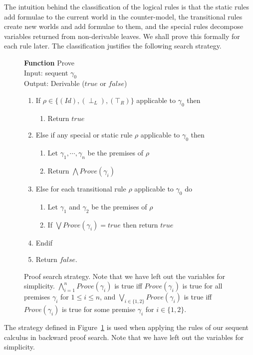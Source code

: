 \documentclass{llncs}
\numberwithin{equation}{section}
\newcommand{\Bottom}{\perp}
\newcommand{\Top}{\top}
\newcommand{\IdRule}{(Id)}
\newcommand{\FalseLeftRule}{(\Bottom_L)}
\newcommand{\TrueRightRule}{(\Top_R)}
\begin{document}
The intuition behind the classification of the logical rules is that the static rules add formulae to the current world in the counter-model, the transitional rules create new worlds and add formulae to them, and the special rules decompose variables returned from non-derivable leaves. We shall prove this formally for each rule later. The classification justifies the following search strategy.

\begin{figure}[t]
\textbf{Function} Prove \\
Input: sequent $\gamma_0$ \\
Output: Derivable ($true$ or $false$)
\begin{enumerate}
	\item If $\rho \in \{ \IdRule, \FalseLeftRule, \TrueRightRule\}$ applicable to $\gamma_0$ then
		\begin{enumerate}
			\item Return $true$
		\end{enumerate}
	\item Else if any special or static rule $\rho$ applicable to $\gamma_0$ then
		\begin{enumerate}
			\item Let $\gamma_1, \cdots, \gamma_n$ be the premises of $\rho$
			\item Return $\bigwedge Prove(\gamma_i)$
		\end{enumerate}
	\item Else for each transitional rule $\rho$ applicable to $\gamma_0$ do
		\begin{enumerate}
			\item Let $\gamma_1$ and $\gamma_2$ be the premises of $\rho$
			\item If $\bigvee Prove(\gamma_i) = true$ then return $true$
		\end{enumerate}
	\item Endif
	\item Return $false$.	
\end{enumerate}
\caption{Proof search strategy. Note that we have left out the variables for simplicity. $\bigwedge_{i=1}^{n} Prove(\gamma_i)$ is true iff $Prove(\gamma_i)$ is true for all premises $\gamma_i$ for $1 \leq i \leq n$, and $\bigvee_{i \in \{1, 2\}} Prove(\gamma_i)$ is true iff $Prove(\gamma_i)$ is true for some premise $\gamma_i$ for $i \in \{1, 2\}$.}
\label{strategyFig}
\end{figure}


\begin{definition}[Strategy]\label{strategy}
The strategy defined in Figure~\ref{strategyFig} is used when applying the rules of our sequent calculus in backward proof search. Note that we have left out the variables for simplicity.
\end{definition}
\end{document}
